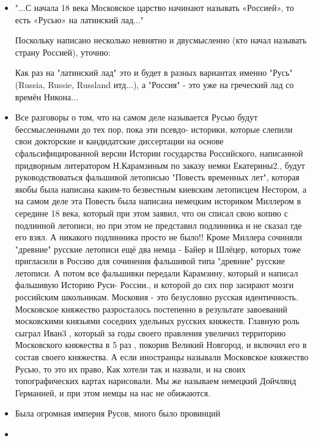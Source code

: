 \begin{itemize}
\item {}

				"...С начала 18 века Московское царство начинают называть «Россией», то есть «Русью» на латинский лад..."

Поскольку написано несколько невнятно и двусмысленно (кто начал называть страну Россией), уточню:

Как раз на "латинский лад" это и будет в разных вариантах именно "Русь" (Russia, Russie, Russland итд...), а "Россия" - это уже на греческий лад со времён Никона...
\item {}

Все разговоры о том, что на самом деле называется Русью будут
бессмысленными до тех пор, пока эти псевдо- историки, которые
слепили свои докторские и кандидатские диссертации на основе
сфальсифицированной версии Истории государства Российского,
написанной придворным литератором Н.Карамзиным по заказу немки
Екатерины2., будут руководствоваться фальшивой летописью
"Повесть временных лет", которая якобы была написана каким-то
безвестным киевским летописцем Нестором, а на самом деле эта
Повесть была написана немецким историком Миллером в середине 18
века, который при этом заявил, что он списал свою копию с
подлинной летописи, но при этом не представил подлинника и не
сказал где его взял. А никакого подлинника просто не было!!
Кроме Миллера сочиняли "древние" русские летописи ещё два немца
- Байер и Шлёцер, которых тоже пригласили в Россию для
сочинения фальшивой типа "древние" русские летописи. А потом
все фальшивки передали Карамзину, который и написал фальшивую
Историю Руси- России., и которой до сих пор засирают мозги
российским школьникам. Московия - это безусловно русская
идентичность. Московское княжество разросталось постепенно в
результате завоеваний московскими князьями соседних удельных
русских княжеств. Главную роль сыграл Иван3 , который за годы
своего правления увеличил территорию Московского княжества в 5
раз , покорив Великий Новгород, и включил его в состав своего
княжества. А если иностранцы называли Московское княжество
Русью, то это их право, Как хотели так и назвали, и на своих
топографических картах нарисовали. Мы же называем немецкий
Дойчлянд Германией, и при этом немцы на нас не обижаются.

\item {}

Была огромная империя Русов, много было провинций

\item {}


\end{itemize}
